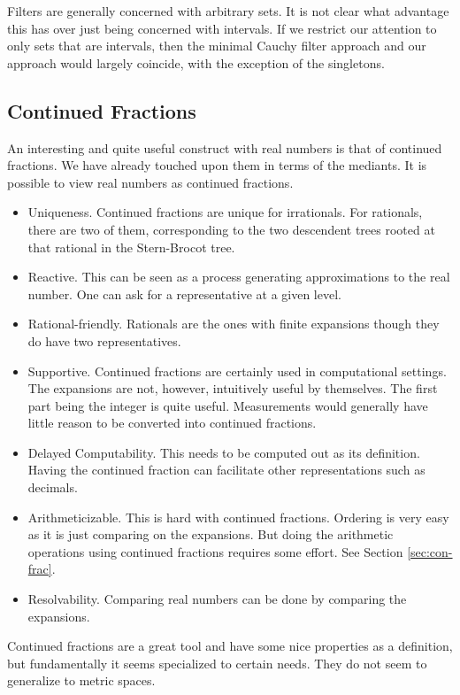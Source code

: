 \documentclass[12pt]{article}
\begin{document}
Filters are generally concerned with arbitrary sets. It is not clear what advantage this has over just being concerned with intervals. If we restrict our attention to only sets that are intervals, then the minimal Cauchy filter approach and our approach would largely coincide, with the exception of the singletons.

\subsection{Continued Fractions}

An interesting and quite useful construct with real numbers is that of continued fractions. We have already touched upon them in terms of the mediants. It is possible to view real numbers as continued fractions. 

\begin{itemize}
    \item Uniqueness. Continued fractions are unique for irrationals. For rationals, there are two of them, corresponding to the two descendent trees rooted at that rational in the Stern-Brocot tree. 
    \item Reactive. This can be seen as a process generating approximations to the real number. One can ask for a representative at a given level.  
    \item Rational-friendly. Rationals are the ones with finite expansions though they do have two representatives. 
    \item Supportive. Continued fractions are certainly used in computational settings. The expansions are not, however, intuitively useful by themselves. The first part being the integer is quite useful. Measurements would generally have little reason to be converted into continued fractions. 
    \item Delayed Computability. This needs to be computed out as its definition. Having the continued fraction can facilitate other representations such as decimals. 
    \item Arithmeticizable. This is hard with continued fractions. Ordering is very easy as it is just comparing on the expansions. But doing the arithmetic operations  using continued fractions requires some effort. See Section \ref{sec:con-frac}.
    \item Resolvability. Comparing real numbers can be done by comparing the expansions.
\end{itemize}

Continued fractions are a great tool and have some nice properties as a definition, but fundamentally it seems specialized to certain needs. They do not seem to generalize to metric spaces. 
\end{document}
